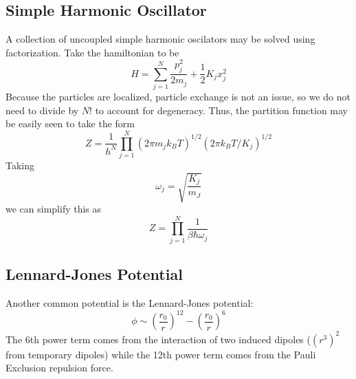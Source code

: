 \subsection{Simple Harmonic Oscillator}
A collection of uncoupled simple harmonic oscilators may be solved using factorization. Take the hamiltonian to be
\[H = \sum_{j=1}^N \frac{p_j^2}{2m_j}+\frac{1}{2}K_jx_j^2\]
Because the particles are localized, particle exchange is not an issue, so we do not need to divide by \(N! \) to account for degeneracy. Thus, the partition function may be easily seen to take the form
\begin{equation}
	Z=\frac{1}{h^N} \prod_{j=1}^N(2\pi m_j k_BT)^{1/2}(2\pi k_BT/K_j)^{1/2}
\end{equation}
Taking
\[\omega_j = \sqrt{\frac{K_j}{m_J}}\]
we can simplify this as
\[Z = \prod_{j=1}^N \frac{1}{\beta \hbar \omega_j}\]

\subsection{Lennard-Jones Potential}
Another common potential is the Lennard-Jones potential:
\begin{equation}
	\phi\sim\left(\frac{r_0}{r}\right)^{12}-\left(\frac{r_0}{r}\right)^{6}
\end{equation}
The 6th power term comes from the interaction of two induced dipoles (\((r^3)^2\) from temporary dipoles) while the 12th power term comes from the Pauli Exclusion repulsion force.

